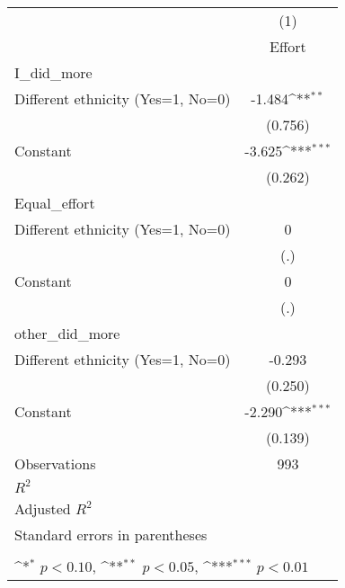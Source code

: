{
\def\sym#1{\ifmmode^{#1}\else\(^{#1}\)\fi}
\begin{tabular}{l*{1}{c}}
\hline\hline
                    &\multicolumn{1}{c}{(1)}\\
                    &\multicolumn{1}{c}{Effort}\\
\hline
I\_did\_more          &                     \\
Different ethnicity (Yes=1, No=0)&      -1.484\sym{**} \\
                    &     (0.756)         \\
[1em]
Constant            &      -3.625\sym{***}\\
                    &     (0.262)         \\
\hline
Equal\_effort        &                     \\
Different ethnicity (Yes=1, No=0)&           0         \\
                    &         (.)         \\
[1em]
Constant            &           0         \\
                    &         (.)         \\
\hline
other\_did\_more      &                     \\
Different ethnicity (Yes=1, No=0)&      -0.293         \\
                    &     (0.250)         \\
[1em]
Constant            &      -2.290\sym{***}\\
                    &     (0.139)         \\
\hline
Observations        &         993         \\
\(R^{2}\)           &                     \\
Adjusted \(R^{2}\)  &                     \\
\hline\hline
\multicolumn{2}{l}{\footnotesize Standard errors in parentheses}\\
\multicolumn{2}{l}{\footnotesize }\\
\multicolumn{2}{l}{\footnotesize \sym{*} \(p<0.10\), \sym{**} \(p<0.05\), \sym{***} \(p<0.01\)}\\
\end{tabular}
}
